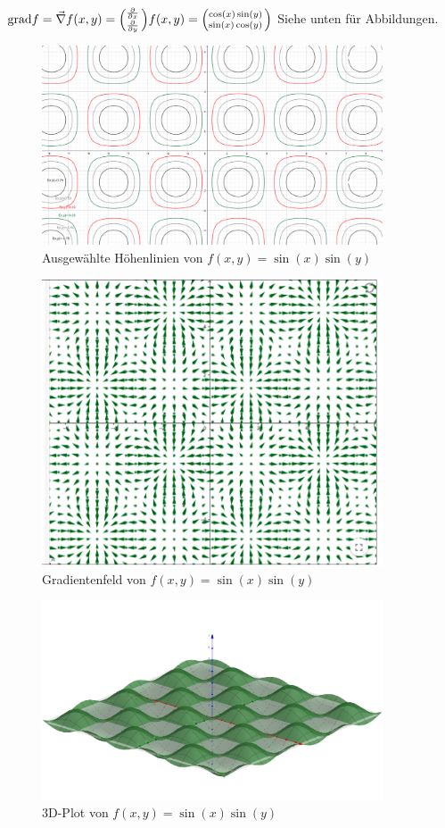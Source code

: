 \item

$\text{grad} f = \vec \nabla f(x,y) = \Bigl(\negthinspace\begin{smallmatrix}\frac{\partial}{\partial x}\\\frac{\partial}{\partial y}\end{smallmatrix}\Bigr) f(x,y) = \Bigl(\negthinspace\begin{smallmatrix}\cos(x)\sin(y)\\\sin(x)\cos(y)\end{smallmatrix}\Bigr)$ Siehe unten für Abbildungen.

\begin{figure}[ht]
  \centering
  \includegraphics[width=0.9\textwidth]{../pool/ex-graph-contour-2-img-a.png}
  \caption{Ausgewählte Höhenlinien von $f(x,y)=\sin(x)\sin(y)$}
  \label{ex-graph-contour-2-img-a}
\end{figure}

\begin{figure}[ht]
  \centering
  \includegraphics[width=0.9\textwidth]{../pool/ex-graph-contour-2-img-b.png}
  \caption{Gradientenfeld von $f(x,y)=\sin(x)\sin(y)$}
  \label{ex-graph-contour-2-img-b}
\end{figure}

\begin{figure}[ht]
  \centering
  \includegraphics[width=0.9\textwidth]{../pool/ex-graph-contour-2-img-c.png}
  \caption{3D-Plot von $f(x,y)=\sin(x)\sin(y)$}
  \label{ex-graph-contour-2-img-c}
\end{figure}

